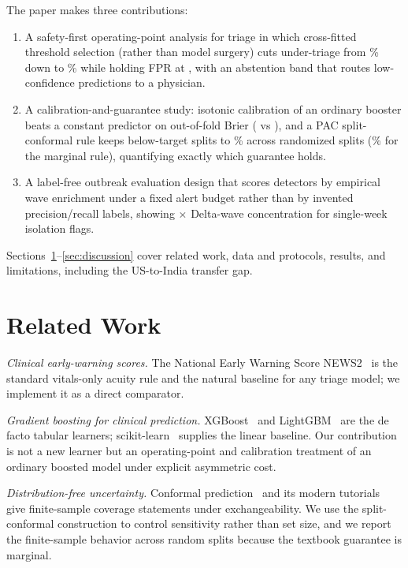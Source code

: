 \documentclass[conference]{IEEEtran}
\begin{document}
The paper makes three contributions:
\begin{enumerate}
\item A safety-first operating-point analysis for triage in which
cross-fitted threshold selection (rather than model surgery) cuts
under-triage from \UnderTPct\% down to \NestedUnderPct\% while holding FPR
at \FPRNested, with an abstention band that routes low-confidence
predictions to a physician.
\item A calibration-and-guarantee study: isotonic calibration of an ordinary
booster beats a constant predictor on out-of-fold Brier (\CalBrier{} vs
\BrierConst), and a PAC split-conformal rule keeps below-target splits to
\PacBelowPct\% across \CNseeds{} randomized splits (\CBelowPct\% for the
marginal rule), quantifying exactly which guarantee holds.
\item A label-free outbreak evaluation design that scores detectors by
empirical wave enrichment under a fixed alert budget rather than by invented
precision/recall labels, showing \DeltaEnr$\times${} Delta-wave
concentration for single-week isolation flags.
\end{enumerate}

Sections~\ref{sec:related}--\ref{sec:discussion} cover related work, data
and protocols, results, and limitations, including the US-to-India transfer
gap.

\section{Related Work}
\label{sec:related}

\emph{Clinical early-warning scores.} The National Early Warning Score
NEWS2~\cite{rcp2017news2,smith2019news2} is the standard vitals-only
acuity rule and the natural baseline for any triage model; we implement it as
a direct comparator.

\emph{Gradient boosting for clinical prediction.} XGBoost~\cite{chen2016xgboost}
and LightGBM~\cite{ke2017lightgbm} are the de facto tabular learners;
scikit-learn~\cite{pedregosa2011scikit} supplies the linear baseline. Our
contribution is not a new learner but an operating-point and calibration
treatment of an ordinary boosted model under explicit asymmetric cost.

\emph{Distribution-free uncertainty.} Conformal
prediction~\cite{vovk2005algorithmic} and its modern
tutorials~\cite{angelopoulos2021gentle} give finite-sample coverage
statements under exchangeability. We use the split-conformal construction to
control sensitivity rather than set size, and we report the finite-sample
behavior across random splits because the textbook guarantee is marginal.
\end{document}
